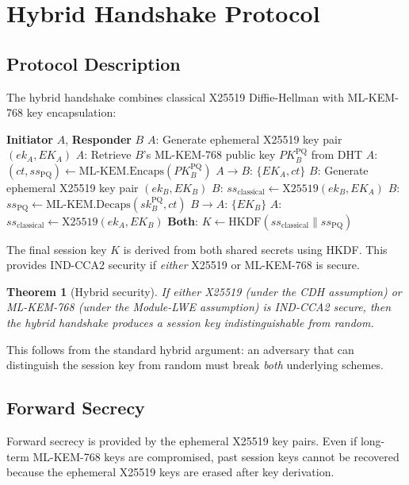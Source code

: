 \documentclass[11pt,twocolumn]{article}
\newtheorem{theorem}{Theorem}
\begin{document}
\section{Hybrid Handshake Protocol}

\subsection{Protocol Description}

The hybrid handshake combines classical X25519 Diffie-Hellman with ML-KEM-768
key encapsulation:

\begin{algorithm}[h]
\caption{Hybrid Handshake}
\begin{algorithmic}[1]
\State \textbf{Initiator} $A$, \textbf{Responder} $B$
\State $A$: Generate ephemeral X25519 key pair $(ek_A, EK_A)$
\State $A$: Retrieve $B$'s ML-KEM-768 public key $PK_B^{\text{PQ}}$ from DHT
\State $A$: $(ct, ss_{\text{PQ}}) \gets \text{ML-KEM.Encaps}(PK_B^{\text{PQ}})$
\State $A \to B$: $\{EK_A, ct\}$
\State $B$: Generate ephemeral X25519 key pair $(ek_B, EK_B)$
\State $B$: $ss_{\text{classical}} \gets \text{X25519}(ek_B, EK_A)$
\State $B$: $ss_{\text{PQ}} \gets \text{ML-KEM.Decaps}(sk_B^{\text{PQ}}, ct)$
\State $B \to A$: $\{EK_B\}$
\State $A$: $ss_{\text{classical}} \gets \text{X25519}(ek_A, EK_B)$
\State \textbf{Both}: $K \gets \text{HKDF}(ss_{\text{classical}} \| ss_{\text{PQ}})$
\end{algorithmic}
\end{algorithm}

The final session key $K$ is derived from both shared secrets using HKDF.
This provides IND-CCA2 security if \emph{either} X25519 or ML-KEM-768 is
secure.

\begin{theorem}[Hybrid security]
If either X25519 (under the CDH assumption) or ML-KEM-768 (under the
Module-LWE assumption) is IND-CCA2 secure, then the hybrid handshake
produces a session key indistinguishable from random.
\end{theorem}

This follows from the standard hybrid argument: an adversary that can
distinguish the session key from random must break \emph{both} underlying
schemes.

\subsection{Forward Secrecy}

Forward secrecy is provided by the ephemeral X25519 key pairs. Even if
long-term ML-KEM-768 keys are compromised, past session keys cannot be
recovered because the ephemeral X25519 keys are erased after key derivation.
\end{document}
